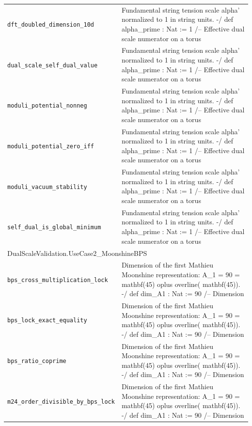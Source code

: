 \begin{longtable}{p{}p{}}
\quad\texttt{\footnotesize dft\_doubled\_dimension\_10d} & {\footnotesize Fundamental string tension scale  alpha' normalized to 1 in string units. -/ def alpha\_prime : Nat := 1 /-- Effective dual scale numerator on a torus } \\
\quad\texttt{\footnotesize dual\_scale\_self\_dual\_value} & {\footnotesize Fundamental string tension scale  alpha' normalized to 1 in string units. -/ def alpha\_prime : Nat := 1 /-- Effective dual scale numerator on a torus } \\
\quad\texttt{\footnotesize moduli\_potential\_nonneg} & {\footnotesize Fundamental string tension scale  alpha' normalized to 1 in string units. -/ def alpha\_prime : Nat := 1 /-- Effective dual scale numerator on a torus } \\
\quad\texttt{\footnotesize moduli\_potential\_zero\_iff} & {\footnotesize Fundamental string tension scale  alpha' normalized to 1 in string units. -/ def alpha\_prime : Nat := 1 /-- Effective dual scale numerator on a torus } \\
\quad\texttt{\footnotesize moduli\_vacuum\_stability} & {\footnotesize Fundamental string tension scale  alpha' normalized to 1 in string units. -/ def alpha\_prime : Nat := 1 /-- Effective dual scale numerator on a torus } \\
\quad\texttt{\footnotesize self\_dual\_is\_global\_minimum} & {\footnotesize Fundamental string tension scale  alpha' normalized to 1 in string units. -/ def alpha\_prime : Nat := 1 /-- Effective dual scale numerator on a torus } \\
\multicolumn{2}{l}{\textsf{\small DualScaleValidation.UseCase2\_MoonshineBPS}} \\
\quad\texttt{\footnotesize bps\_cross\_multiplication\_lock} & {\footnotesize Dimension of the first Mathieu Moonshine representation: A\_1 = 90 =  mathbf(45)  oplus  overline( mathbf(45)). -/ def dim\_A1 : Nat := 90 /-- Dimension} \\
\quad\texttt{\footnotesize bps\_lock\_exact\_equality} & {\footnotesize Dimension of the first Mathieu Moonshine representation: A\_1 = 90 =  mathbf(45)  oplus  overline( mathbf(45)). -/ def dim\_A1 : Nat := 90 /-- Dimension} \\
\quad\texttt{\footnotesize bps\_ratio\_coprime} & {\footnotesize Dimension of the first Mathieu Moonshine representation: A\_1 = 90 =  mathbf(45)  oplus  overline( mathbf(45)). -/ def dim\_A1 : Nat := 90 /-- Dimension} \\
\quad\texttt{\footnotesize m24\_order\_divisible\_by\_bps\_lock} & {\footnotesize Dimension of the first Mathieu Moonshine representation: A\_1 = 90 =  mathbf(45)  oplus  overline( mathbf(45)). -/ def dim\_A1 : Nat := 90 /-- Dimension} \\

\end{longtable}
